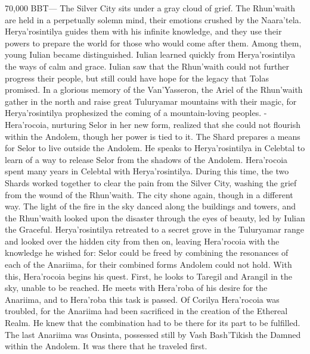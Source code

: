 \documentclass[smalldemyvopaper,11pt,twoside,onecolumn,openright,extrafontsizes]{memoir}
\begin{document}
{{70,000 BBT— The Silver City sits under a gray cloud of grief. The Rhun’waith are held in a perpetually solemn mind, their emotions crushed by the Naara’tela. Herya’rosintilya guides them with his infinite knowledge, and they use their powers to prepare the world for those who would come after them. Among them, young Iulian became distinguished. Iulian learned quickly from Herya’rosintilya the ways of calm and grace. Iulian saw that the Rhun’waith could not further progress their people, but still could have hope for the legacy that Tolas promised. In a glorious memory of the Van’Yasseron, the Ariel of the Rhun’waith gather in the north and raise great Tuluryamar mountains with their magic, for Herya’rosintilya prophesized the coming of a mountain-loving peoples.
-Hera’rocoia, nurturing Selor in her new form, realized that she could not flourish within the Andolem, though her power is tied to it. The Shard prepares a means for Selor to live outside the Andolem. He speaks to Herya’rosintilya in Celebtal to learn of a way to release Selor from the shadows of the Andolem. Hera’rocoia spent many years in Celebtal with Herya’rosintilya. During this time, the two Shards worked together to clear the pain from the Silver City, washing the grief from the wound of the Rhun’waith. The city shone again, though in a different way. The light of the fire in the sky danced along the buildings and towers, and the Rhun’waith looked upon the disaster through the eyes of beauty, led by Iulian the Graceful. Herya’rosintilya retreated to a secret grove in the Tuluryamar range and looked over the hidden city from then on, leaving Hera’rocoia with the knowledge he wished for: Selor could be freed by combining the resonances of each of the Anariima, for their combined forms Andolem could not hold. With this, Hera’rocoia begins his quest. First, he looks to Taregil and Arangil in the sky, unable to be reached. He meets with Hera’roba of his desire for the Anariima, and to Hera’roba this task is passed. Of Corilya Hera’rocoia was troubled, for the Anariima had been sacrificed in the creation of the Ethereal Realm. He knew that the combination had to be there for its part to be fulfilled. The last Anariima was Onsinta, possessed still by Vash Bash’Tikish the Damned within the Andolem. It was there that he traveled first.
}}
\end{document}
